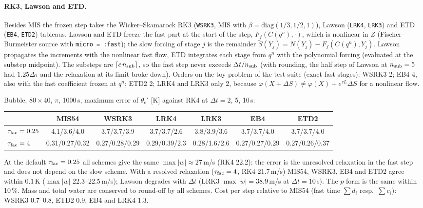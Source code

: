 \documentclass[11pt,a4paper]{article}
\newcommand{\code}[1]{\texttt{#1}}
\newcommand{\dt}{\Delta t}
\begin{document}
\paragraph{RK3, Lawson and ETD.} Besides MIS the frozen step takes the Wicker--Skamarock RK3
(\code{WSRK3}, MIS with $\beta=\mathrm{diag}(1/3,1/2,1)$), Lawson (\code{LRK4}, \code{LRK3}) and ETD
(\code{EB4}, \code{ETD2}) tableaus. Lawson and ETD freeze the fast part at the start of the step,
$F_f(C(q^n),\cdot)$, which is nonlinear in $Z$ (Fischer--Burmeister source with \code{micro = :fast}); the
slow forcing of stage $j$ is the remainder $\tilde S(Y_j)=N(Y_j)-F_f(C(q^n),Y_j)$. Lawson propagates the
increments with the nonlinear fast flow, ETD integrates each stage from $q^n$ with the polynomial forcing
(evaluated at the substep midpoint). The substeps are $\lceil c\,n_{\rm sub}\rceil$, so the fast step never
exceeds $\dt/n_{\rm sub}$ (with rounding, the half step of Lawson at $n_{\rm sub}=5$ had $1.25\Delta\tau$
and the relaxation at its limit broke down). Orders on the toy problem of the test suite (exact fast
stages): WSRK3 2; EB4 4, also with the fast coefficient frozen at $q^n$; ETD2 2; LRK4 and LRK3 only 2,
because $\varphi(X+\Delta S)\neq\varphi(X)+e^{\tau L}\Delta S$ for a nonlinear flow.

Bubble, $80\times40$, $\pi$, 1000\,s, maximum error of $\theta_e'$ [K] against RK4 at $\dt=2$, 5, 10\,s:
\begin{center}\small\setlength{\tabcolsep}{3pt}\begin{tabular}{lcccccc}\toprule
& MIS54 & WSRK3 & LRK4 & LRK3 & EB4 & ETD2\\\midrule
$\tau_{\rm fac}=0.25$ & 4.1/3.6/4.0 & 3.7/3.7/3.9 & 3.7/3.7/2.6 & 3.8/3.9/3.6 & 3.7/3.7/4.0 & 3.7/3.7/4.0\\
$\tau_{\rm fac}=4$ & 0.31/0.27/0.32 & 0.27/0.28/0.29 & 0.29/0.39/2.3 & 0.28/1.6/2.6 & 0.27/0.27/0.29 & 0.27/0.26/0.37\\\bottomrule
\end{tabular}\end{center}
At the default $\tau_{\rm fac}=0.25$ all schemes give the same $\max|w|\approx27$\,m/s (RK4 22.2): the error
is the unresolved relaxation in the fast step and does not depend on the slow scheme. With a resolved
relaxation ($\tau_{\rm fac}=4$, RK4 21.7\,m/s) MIS54, WSRK3, EB4 and ETD2 agree within 0.1\,K
($\max|w|$ 22.3--22.5\,m/s); Lawson degrades with $\dt$ (LRK3 $\max|w|=38.9$\,m/s at $\dt=10$\,s). The $p$
form is the same within 10\,\%. Mass and total water are conserved to round-off by all schemes. Cost per
step relative to MIS54 (fast time $\sum d_i$ resp.\ $\sum c_i$): WSRK3 0.7--0.8, ETD2 0.9, EB4 and LRK4 1.3.
\end{document}
